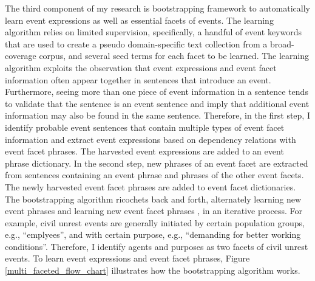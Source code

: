 The third component of my research is
bootstrapping framework to automatically learn event expressions as well as essential facets of events. 
The learning algorithm relies on limited supervision, specifically, a handful of event keywords 
that are used to create a pseudo domain-specific text collection 
from a broad-coverage corpus, and several seed terms for each facet to be learned. 
The learning algorithm exploits the observation that event expressions and event facet information 
often appear together in sentences that introduce an event. 
Furthermore, seeing more than one piece of event information in a sentence tends to 
validate that the sentence is an event 
sentence and imply that 
additional event information may also be found in the same sentence.  
Therefore, in the first step, I identify probable event sentences that contain multiple types of 
event facet information and extract event expressions 
based on dependency relations with
event facet phrases. The harvested event expressions are added
to an event phrase dictionary. In the second step, 
new phrases of an event facet are extracted
from sentences containing an event phrase and phrases of the other event facets. 
The newly harvested event facet phrases are 
added to event facet dictionaries. 
The bootstrapping algorithm ricochets back and forth, alternately 
learning new event phrases 
and learning new 
event facet phrases
, in
an iterative process. 
For example, civil unrest events are generally initiated by certain population groups, 
e.g., ``emplyees'', and with certain purpose, e.g., ``demanding for better working conditions''. 
Therefore, I identify agents and purposes as two facets of civil unrest events.  
To learn event expressions and event facet phrases, 
Figure \ref{multi_faceted_flow_chart} illustrates how the bootstrapping algorithm works.

